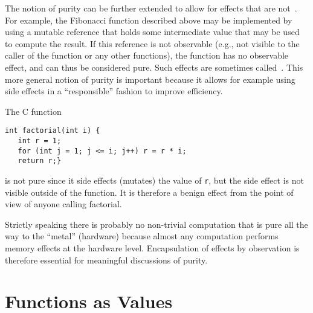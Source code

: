 \begin{flex}
\label{grp:grm:language::functional-algorithms::benign-effects}

\begin{gram}
\label{grm:language::functional-algorithms::benign-effects}
The notion of purity can be further extended to allow for effects
that are not~.  
For example, the Fibonacci function
described above may be implemented by using a mutable reference that
holds some intermediate value that may be used to compute
the result.
If this reference is not observable (e.g., not visible to the caller
of the function or any other functions), the function has no observable
effect, and can thus be considered pure.  Such effects are sometimes
called~.
This more general notion of purity is important because it allows for
example using side effects in a ``responsible'' fashion to improve
efficiency.

\end{gram}

\begin{example}
\label{xmpl:language::functional-algorithms::factorial}
The C function 
\begin{verbatim}
int factorial(int i) {
   int r = 1;
   for (int j = 1; j <= i; j++) r = r * i;
   return r;}
\end{verbatim}
is not pure since it side effects (mutates) the value of \texttt{r}, but the
side effect is not visible outside of the function.   It is therefore
a benign effect from the point of view of anyone calling factorial.

\end{example}
\end{flex}

\begin{cluster}
\label{grp:imp:language::functional-algorithms::strictly}

\begin{important}
\label{imp:language::functional-algorithms::strictly}
Strictly speaking there is probably no non-trivial computation that is
pure all the way to the ``metal'' (hardware) because almost any computation performs memory effects at the
hardware level.  Encapsulation of effects by observation is therefore
essential for meaningful discussions of purity.

\end{important}
\end{cluster}


\section{Functions as Values}
\label{sec:language::functional-algorithms::functions-as-values}


